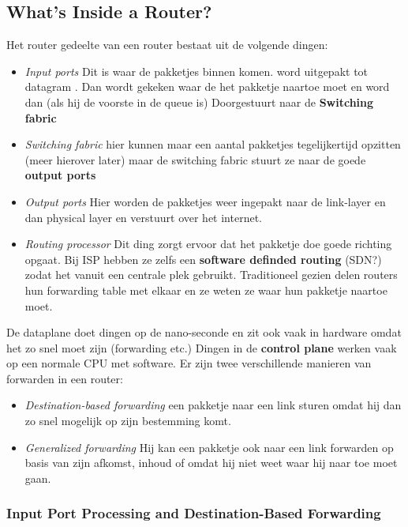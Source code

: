 \subsection{What's Inside a Router?}
Het router gedeelte van een router bestaat uit de volgende dingen:
\begin{itemize}
    \item \textit{Input ports} Dit is waar de pakketjes binnen komen. word uitgepakt tot datagram . Dan wordt gekeken waar de het pakketje naartoe moet en word dan (als hij de voorste in de queue is) Doorgestuurt naar de \textbf{Switching fabric}
    \item \textit{Switching fabric} hier kunnen maar een aantal pakketjes tegelijkertijd opzitten (meer hierover later) maar  de switching fabric stuurt ze naar de goede \textbf{output ports}
    \item \textit{Output ports} Hier worden de pakketjes weer ingepakt naar de link-layer en dan physical layer en verstuurt over het internet.
    \item \textit{Routing processor} Dit ding zorgt ervoor dat het pakketje doe goede richting opgaat. Bij ISP hebben ze zelfs een \textbf{software definded routing} (SDN?) zodat het vanuit een centrale plek gebruikt. Traditioneel gezien delen routers hun forwarding table met elkaar en ze weten ze waar hun pakketje naartoe moet.
\end{itemize}
\newline
De dataplane doet dingen op de nano-seconde en zit ook vaak in hardware omdat het zo snel moet zijn (forwarding etc.) Dingen in de \textbf{control plane} werken vaak op een normale CPU met software.
\newline
Er zijn twee verschillende manieren van forwarden in een router:
\begin{itemize}
    \item \textit{Destination-based forwarding} een pakketje naar een link sturen omdat hij dan zo snel mogelijk op zijn bestemming komt.
    \item \textit{Generalized forwarding} Hij kan een pakketje ook naar een link forwarden op basis van zijn afkomst, inhoud of omdat hij niet weet waar hij naar toe moet gaan.
\end{itemize}
\subsubsection{Input Port Processing and Destination-Based Forwarding}
